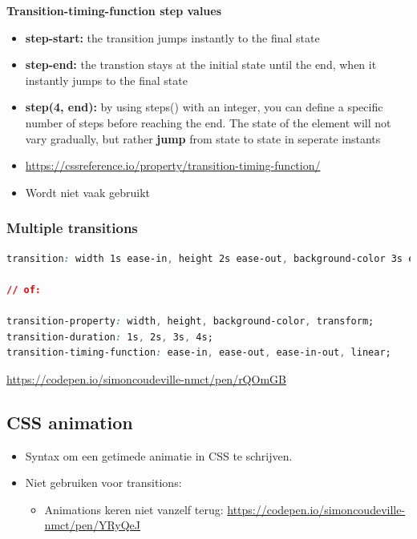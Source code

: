 \documentclass{article}
\newcommand{\bold}[1]{\textbf{#1}}
\begin{document}
\bold{Transition-timing-function step values}

\begin{itemize}
    \item \bold{step-start:} the transition jumps instantly to the final state
    \item \bold{step-end:} the transtion stays at the initial state until the end, when it instantly jumps to the final state
    \item \bold{step(4, end):} by using steps() with an integer, you can define a specific number of steps before reaching the end.
    The state of the element will not vary gradually, but rather \bold{jump} from state to state in seperate instants
    \item \url{https://cssreference.io/property/transition-timing-function/}
    \item Wordt niet vaak gebruikt
\end{itemize}

\subsubsection{Multiple transitions}
\begin{lstlisting}[language=CSS]
transition: width 1s ease-in, height 2s ease-out, background-color 3s ease-in-out, transform 4s linear;

// of:

transition-property: width, height, background-color, transform;
transition-duration: 1s, 2s, 3s, 4s;
transition-timing-function: ease-in, ease-out, ease-in-out, linear;
\end{lstlisting}

\url{https://codepen.io/simoncoudeville-nmct/pen/rQOmGB}

\subsection{CSS animation}
\begin{itemize}
    \item Syntax om een getimede animatie in CSS te schrijven.
    \item Niet gebruiken voor transitions:
    \begin{itemize}
        \item Animations keren niet vanzelf terug: \url{https://codepen.io/simoncoudeville-nmct/pen/YRyQeJ}
    \end{itemize}
\end{itemize}
\end{document}
